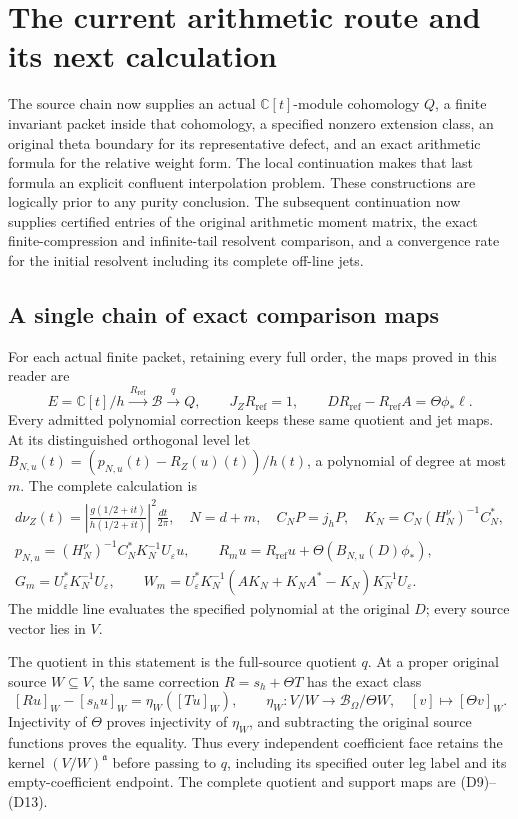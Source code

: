 \section{The current arithmetic route and its next calculation}
\label{sec:research-state}
The source chain now supplies an actual \(\mathbb C[t]\)-module
cohomology \(Q\), a finite invariant packet inside that cohomology,
a specified nonzero extension class, an original theta boundary
for its representative defect, and an exact arithmetic formula
for the relative weight form. The local continuation makes that
last formula an explicit confluent interpolation problem.
These constructions are logically prior to any purity conclusion.
The subsequent continuation now supplies certified entries of the
original arithmetic moment matrix, the exact finite-compression
and infinite-tail resolvent comparison, and a convergence rate for
the initial resolvent including its complete off-line jets.

\subsection{A single chain of exact comparison maps}
For each actual finite packet, retaining every full order, the
maps proved in this reader are
\[
 E=\mathbb C[t]/h
 \xrightarrow{\,R_{\mathrm{ref}}\,}\mathscr B
 \xrightarrow{\,q\,}Q,\qquad
 J_ZR_{\mathrm{ref}}=1,\qquad
 DR_{\mathrm{ref}}-R_{\mathrm{ref}}A
       =\Theta\phi_*\ell .
\]
Every admitted polynomial correction keeps these same quotient
and jet maps. At its distinguished orthogonal level let \(B_{N,u}(t)=(p_{N,u}(t)-R_Z(u)(t))/h(t)\), a polynomial of degree at most \(m\). The complete calculation is
\[
\begin{gathered}
 d\nu_Z(t)=\left|\frac{g(1/2+it)}{h(1/2+it)}\right|^2
       \frac{dt}{2\pi},\quad N=d+m,\quad
 C_NP=j_hP,\quad
 K_N=C_N(H_N^\nu)^{-1}C_N^*,\\
 p_{N,u}=(H_N^\nu)^{-1}C_N^*K_N^{-1}U_\varepsilon u,\qquad
 R_mu=R_{\mathrm{ref}}u+
       \Theta(B_{N,u}(D)\phi_*),\\
 G_m=U_\varepsilon^*K_N^{-1}U_\varepsilon,\qquad
 W_m=U_\varepsilon^*K_N^{-1}
     (AK_N+K_NA^*-K_N)K_N^{-1}U_\varepsilon .
\end{gathered}
\tag{R1}
\]
The middle line evaluates the specified polynomial at the original \(D\); every source vector lies in \(V\).

The quotient in this statement is the full-source quotient $q$.
At a proper original source $W\subseteq V$, the same correction
$R=s_h+\Theta T$ has the exact class
\[
 [Ru]_W-[s_hu]_W=\eta_W([Tu]_W),\qquad
 \eta_W:V/W\longrightarrow\mathscr B_\Omega/\Theta W,
 \quad[v]\longmapsto[\Theta v]_W.
\tag{R1a}
\]
Injectivity of $\Theta$ proves injectivity of $\eta_W$, and
subtracting the original source functions proves the equality.
Thus every independent coefficient face retains the kernel
$(V/W)^{\mathfrak a}$ before passing to $q$, including its
specified outer leg label and its empty-coefficient endpoint.
The complete quotient and support maps are (D9)--(D13).


